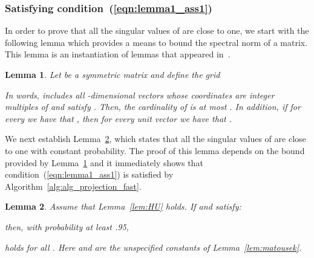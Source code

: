 \documentclass[11pt]{article}
\newtheorem{lemma}{Lemma}
\begin{document}
\subsubsection{Satisfying condition~(\ref{eqn:lemma1_ass1})}
In order to prove that all the singular values of  are close to one, we start with the following lemma which provides a means to bound the spectral norm of a matrix. This lemma is an instantiation of lemmas that appeared in~\cite{AHK06,FO05}.
\begin{lemma}\label{lem:AroraHazenKale}
Let  be a  symmetric matrix and define the grid

In words,  includes all -dimensional vectors  whose coordinates are integer multiples of  and satisfy . Then, the cardinality of  is at most . In addition, if for every  we have that , then for every unit vector  we have that .
\end{lemma}
We next establish Lemma~\ref{lem:project_lem20pf}, which states that all the singular values of  are close to one with constant probability. The proof of this lemma depends on the bound provided by Lemma~\ref{lem:AroraHazenKale} and it immediately shows that condition~(\ref{eqn:lemma1_ass1}) is satisfied by Algorithm~\ref{alg:alg_projection_fast}.
\begin{lemma}\label{lem:project_lem20pf}
Assume that Lemma~\ref{lem:HU} holds. If  and  satisfy:

then, with probability at least .95,

holds for all . Here  and  are the unspecified constants of Lemma~\ref{lem:matousek}.
\end{lemma}
\end{document}
